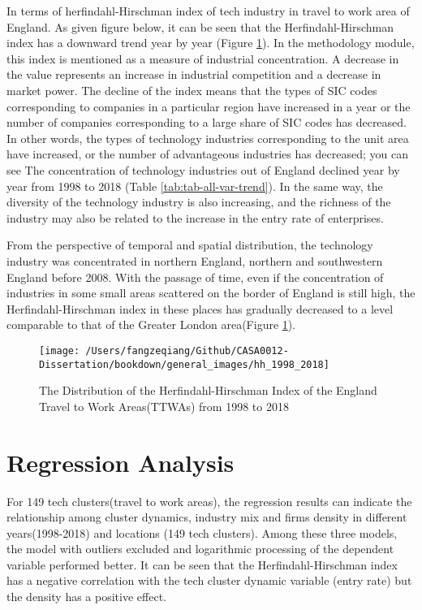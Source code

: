 \documentclass[
  12pt,
  oneside]{book}
\begin{document}
In terms of herfindahl-Hirschman index of tech industry in travel to work area of England. As given figure below, it can be seen that the Herfindahl-Hirschman index has a downward trend year by year (Figure \ref{fig:fig-hh-1998-2018}). In the methodology module, this index is mentioned as a measure of industrial concentration. A decrease in the value represents an increase in industrial competition and a decrease in market power. The decline of the index means that the types of SIC codes corresponding to companies in a particular region have increased in a year or the number of companies corresponding to a large share of SIC codes has decreased. In other words, the types of technology industries corresponding to the unit area have increased, or the number of advantageous industries has decreased; you can see The concentration of technology industries out of England declined year by year from 1998 to 2018 (Table \ref{tab:tab-all-var-trend}). In the same way, the diversity of the technology industry is also increasing, and the richness of the industry may also be related to the increase in the entry rate of enterprises.

From the perspective of temporal and spatial distribution, the technology industry was concentrated in northern England, northern and southwestern England before 2008. With the passage of time, even if the concentration of industries in some small areas scattered on the border of England is still high, the Herfindahl-Hirschman index in these places has gradually decreased to a level comparable to that of the Greater London area(Figure \ref{fig:fig-hh-1998-2018}).

\begin{figure}
\texttt{[image: /Users/fangzeqiang/Github/CASA0012-Dissertation/bookdown/general\_images/hh\_1998\_2018]} \caption{The Distribution of the Herfindahl-Hirschman Index of the England Travel to Work Areas(TTWAs) from 1998 to 2018}\label{fig:fig-hh-1998-2018}
\end{figure}

\hypertarget{regression-analysis}{%
\section{Regression Analysis}\label{regression-analysis}}

For 149 tech clusters(travel to work areas), the regression results can indicate the relationship among cluster dynamics, industry mix and firms density in different years(1998-2018) and locations (149 tech clusters). Among these three models, the model with outliers excluded and logarithmic processing of the dependent variable performed better. It can be seen that the Herfindahl-Hirschman index has a negative correlation with the tech cluster dynamic variable (entry rate) but the density has a positive effect.
\end{document}
